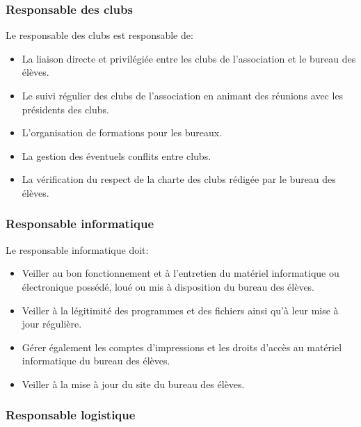 \documentclass{article} %
\begin{document}
			\subsubsection{Responsable des clubs}
\label{ssub:responsable_des_clubs}

				Le responsable des clubs est responsable de:
				\begin{itemize}
					\item La liaison directe et privilégiée entre les clubs de
						l’association et le bureau des élèves.
					\item Le suivi régulier des clubs de l’association en
						animant des réunions avec les
						présidents des clubs.
					\item L’organisation de formations pour les bureaux.
					\item La gestion des éventuels conflits entre clubs.
					\item La vérification du respect de la charte des clubs
						rédigée par le bureau des élèves.
				\end{itemize}

			\subsubsection{Responsable informatique}
\label{ssub:responsable_informatique}

				Le responsable informatique doit:
				\begin{itemize}
					\item Veiller au bon fonctionnement et à l’entretien du
						matériel informatique ou électronique possédé, loué ou
						mis à disposition du bureau des élèves.
					\item Veiller à la légitimité des programmes et des fichiers
						ainsi qu’à leur mise à jour régulière.
					\item Gérer également les comptes d’impressions et les
						droits d’accès au matériel informatique du bureau des
						élèves.
					\item Veiller à la mise à jour du site du bureau des élèves.
				\end{itemize}

			\subsubsection{Responsable logistique}
\label{ssub:responsable_logistique}
\end{document}
